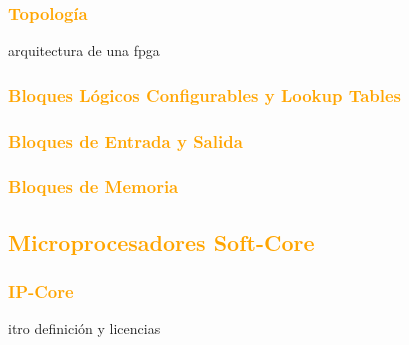 \documentclass[a4paper,11pt]{article}
\begin{document}

		\subsubsection{\textcolor{orange}{Topología}}	
arquitectura de una fpga
		\subsubsection{\textcolor{orange}{Bloques Lógicos Configurables y Lookup Tables}}
		\subsubsection{\textcolor{orange}{Bloques de Entrada y Salida}}
		\subsubsection{\textcolor{orange}{Bloques de Memoria}}
	\subsection{\textcolor{orange}{Microprocesadores Soft-Core }}
		\subsubsection{\textcolor{orange}{ IP-Core}}
itro definición y licencias
\end{document}
